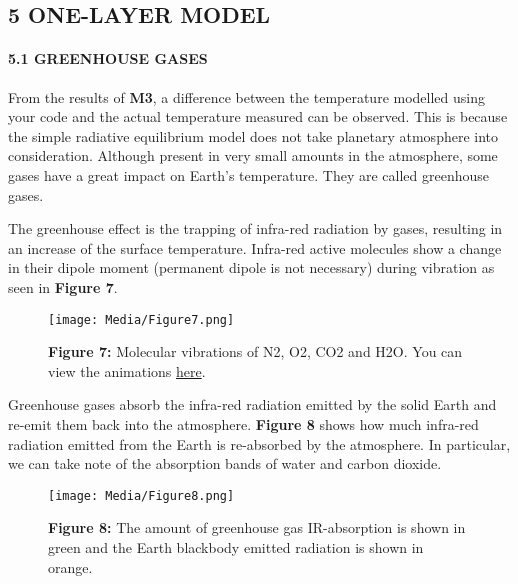 \documentclass[
  letterpaper,
  DIV=11,
  numbers=noendperiod]{scrartcl}
\let\oldparagraph\paragraph
\renewcommand{\paragraph}[1]{\oldparagraph{#1}\mbox{}}
\begin{document}
\hypertarget{one-layer-model}{%
\subsection{5 \textbar{} ONE-LAYER MODEL}\label{one-layer-model}}

\hypertarget{greenhouse-gases}{%
\paragraph{5.1 GREENHOUSE GASES}\label{greenhouse-gases}}

From the results of \textbf{M3}, a difference between the temperature
modelled using your code and the actual temperature measured can be
observed. This is because the simple radiative equilibrium model does
not take planetary atmosphere into consideration. Although present in
very small amounts in the atmosphere, some gases have a great impact on
Earth's temperature. They are called greenhouse gases.

The greenhouse effect is the trapping of infra-red radiation by gases,
resulting in an increase of the surface temperature. Infra-red active
molecules show a change in their dipole moment (permanent dipole is not
necessary) during vibration as seen in \textbf{Figure 7}.

\begin{figure}

{\centering \texttt{[image: Media/Figure7.png]}

}

\caption{\textbf{Figure 7:} Molecular vibrations of N2, O2, CO2 and H2O.
You can view the animations
\href{https://scied.ucar.edu/learning-zone/atmosphere/molecular-vibration-modes}{here}.}

\end{figure}

Greenhouse gases absorb the infra-red radiation emitted by the solid
Earth and re-emit them back into the atmosphere. \textbf{Figure 8} shows
how much infra-red radiation emitted from the Earth is re-absorbed by
the atmosphere. In particular, we can take note of the absorption bands
of water and carbon dioxide.

\begin{figure}

{\centering \texttt{[image: Media/Figure8.png]}

}

\caption{\textbf{Figure 8:} The amount of greenhouse gas IR-absorption
is shown in green and the Earth blackbody emitted radiation is shown in
orange.}

\end{figure}
\end{document}
